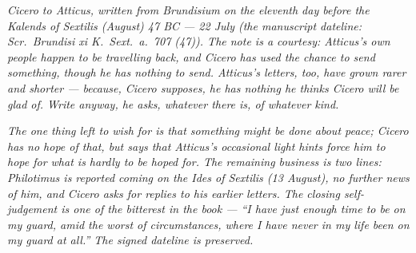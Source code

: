 
\textit{Cicero to Atticus, written from Brundisium on
the eleventh day before the Kalends of Sextilis (August)
47 BC --- 22 July (the manuscript dateline:
\textit{Scr.\ Brundisi xi K.\ Sext.\ a.\ 707 (47)}). The
note is a courtesy: Atticus's own people happen to be
travelling back, and Cicero has used the chance to send
something, though he has nothing to send. Atticus's
letters, too, have grown rarer and shorter --- because,
Cicero supposes, he has nothing he thinks Cicero will
be glad of. Write anyway, he asks, whatever there is,
of whatever kind.}

\textit{The one thing left to wish for is that
something might be done about peace; Cicero has no hope
of that, but says that Atticus's occasional light hints
force him to hope for what is hardly to be hoped for.
The remaining business is two lines: Philotimus is
reported coming on the Ides of Sextilis (13 August),
no further news of him, and Cicero asks for replies to
his earlier letters. The closing self-judgement is one
of the bitterest in the book --- ``I have just enough
time to be on my guard, amid the worst of
circumstances, where I have never in my life been on
my guard at all.'' The signed dateline is preserved.}
